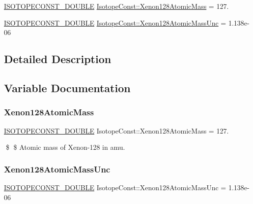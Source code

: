\begin{DoxyCompactItemize}
\item 
\mbox{\hyperlink{group___isotope_const-_macros_ga8f45a7272ce02c0b4c65c44636ed719a}{I\+S\+O\+T\+O\+P\+E\+C\+O\+N\+S\+T\+\_\+\+D\+O\+U\+B\+LE}} \mbox{\hyperlink{group___isotope_const-_xenon-_xe128_ga35a52614e1db1bde3e63d2b367a7e0c0}{Isotope\+Const\+::\+Xenon128\+Atomic\+Mass}} = 127.
\item 
\mbox{\hyperlink{group___isotope_const-_macros_ga8f45a7272ce02c0b4c65c44636ed719a}{I\+S\+O\+T\+O\+P\+E\+C\+O\+N\+S\+T\+\_\+\+D\+O\+U\+B\+LE}} \mbox{\hyperlink{group___isotope_const-_xenon-_xe128_ga0e6d089e43841f9316c01cc85a5f923a}{Isotope\+Const\+::\+Xenon128\+Atomic\+Mass\+Unc}} = 1.\+138e-\/06
\end{DoxyCompactItemize}


\subsection{Detailed Description}


\subsection{Variable Documentation}
\mbox{\label{group___isotope_const-_xenon-_xe128_ga35a52614e1db1bde3e63d2b367a7e0c0}} 
\subsubsection{\texorpdfstring{Xenon128\+Atomic\+Mass}{Xenon128AtomicMass}}
{\footnotesize\ttfamily \mbox{\hyperlink{group___isotope_const-_macros_ga8f45a7272ce02c0b4c65c44636ed719a}{I\+S\+O\+T\+O\+P\+E\+C\+O\+N\+S\+T\+\_\+\+D\+O\+U\+B\+LE}} Isotope\+Const\+::\+Xenon128\+Atomic\+Mass = 127.}

\$ \$ Atomic mass of Xenon-\/128 in amu. \mbox{\label{group___isotope_const-_xenon-_xe128_ga0e6d089e43841f9316c01cc85a5f923a}} 
\subsubsection{\texorpdfstring{Xenon128\+Atomic\+Mass\+Unc}{Xenon128AtomicMassUnc}}
{\footnotesize\ttfamily \mbox{\hyperlink{group___isotope_const-_macros_ga8f45a7272ce02c0b4c65c44636ed719a}{I\+S\+O\+T\+O\+P\+E\+C\+O\+N\+S\+T\+\_\+\+D\+O\+U\+B\+LE}} Isotope\+Const\+::\+Xenon128\+Atomic\+Mass\+Unc = 1.\+138e-\/06}

